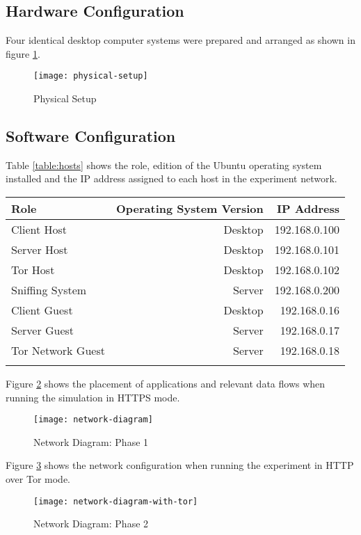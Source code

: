 \subsection{Hardware Configuration}

Four identical desktop computer systems were prepared and arranged as shown
in figure \ref{physical-setup}.

\begin{figure}[H]
  \centering\texttt{[image: physical-setup]}
  \caption{Physical Setup}
  \label{physical-setup}
\end{figure}

\subsection{Software Configuration}

Table \ref{table:hosts} shows the role, edition of the Ubuntu operating system
installed and the IP address assigned to each host in the experiment network.

\begin{tabular}{lrr}
  \toprule
  Role & Operating System Version & IP Address\\
  \midrule
  Client Host & Desktop & 192.168.0.100\\
  Server Host & Desktop & 192.168.0.101\\
  Tor Host & Desktop & 192.168.0.102\\
  \midrule
  Sniffing System & Server & 192.168.0.200\\
  \midrule
  Client Guest & Desktop & 192.168.0.16\\
  Server Guest & Server & 192.168.0.17\\
  Tor Network Guest & Server & 192.168.0.18\\
  \bottomrule
  \label{table:hosts}
\end{tabular}

Figure \ref{network-diagram} shows the placement of applications and relevant
data flows when running the simulation in HTTPS mode.

\begin{figure}[H]
  \centering\texttt{[image: network-diagram]}
  \caption{Network Diagram: Phase 1}
  \label{network-diagram}
\end{figure}

Figure \ref{network-diagram-with-tor} shows the network configuration when
running the experiment in HTTP over Tor mode.

\begin{figure}[H]
  \centering\texttt{[image: network-diagram-with-tor]}
  \caption{Network Diagram: Phase 2}
  \label{network-diagram-with-tor}
\end{figure}

